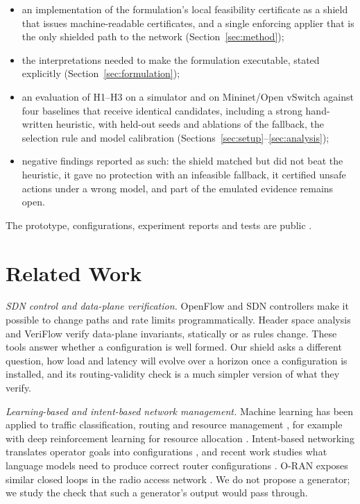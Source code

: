 \documentclass[conference]{IEEEtran}
\begin{document}
\begin{itemize}
\item an implementation of the formulation's local feasibility certificate as a
shield that issues machine-readable certificates, and a single enforcing applier
that is the only shielded path to the network (Section~\ref{sec:method});
\item the interpretations needed to make the formulation executable, stated
explicitly (Section~\ref{sec:formulation});
\item an evaluation of H1--H3 on a simulator and on Mininet/Open vSwitch against four
baselines that receive identical candidates, including a strong hand-written
heuristic, with held-out seeds and ablations of the fallback, the selection rule and
model calibration (Sections~\ref{sec:setup}--\ref{sec:analysis});
\item negative findings reported as such: the shield matched but did not beat the
heuristic, it gave no protection with an infeasible fallback, it certified unsafe
actions under a wrong model, and part of the emulated evidence remains open.
\end{itemize}

The prototype, configurations, experiment reports and tests are public
\cite{vgcp_repo}.

\section{Related Work}

\emph{SDN control and data-plane verification.} OpenFlow
\cite{mckeown2008openflow} and SDN controllers \cite{kreutz2015sdn,berde2014onos}
make it possible to change paths and rate limits programmatically. Header space
analysis \cite{kazemian2012hsa} and VeriFlow \cite{khurshid2013veriflow} verify
data-plane invariants, statically or as rules change. These tools answer whether a
configuration is well formed. Our shield asks a different question, how load and
latency will evolve over a horizon once a configuration is installed, and its
routing-validity check is a much simpler version of what they verify.

\emph{Learning-based and intent-based network management.} Machine learning has
been applied to traffic classification, routing and resource management
\cite{boutaba2018mlnet}, for example with deep reinforcement learning for resource
allocation \cite{mao2016deeprm}. Intent-based networking translates operator goals
into configurations \cite{leivadeas2023ibn}, and recent work studies what language
models need to produce correct router configurations \cite{mondal2023llmconfig}.
O-RAN exposes similar closed loops in the radio access network
\cite{polese2023oran}. We do not propose a generator; we study the check that such a
generator's output would pass through.
\end{document}
